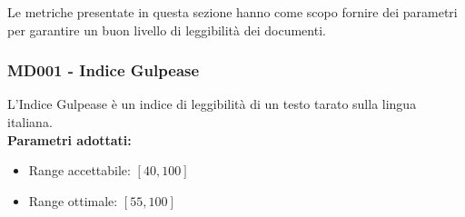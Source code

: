 Le metriche presentate in questa sezione hanno come scopo fornire dei parametri per garantire un buon livello di leggibilità dei documenti.

\subsubsection{MD001 - Indice Gulpease}\mbox{}
L'Indice Gulpease è un indice di leggibilità di un testo tarato sulla lingua italiana. \\[0,2cm]
\textbf{Parametri adottati:}
\begin{itemize}
	\item Range accettabile: $[40 , 100]$
	\item Range ottimale: $[55 , 100]$
\end{itemize}
